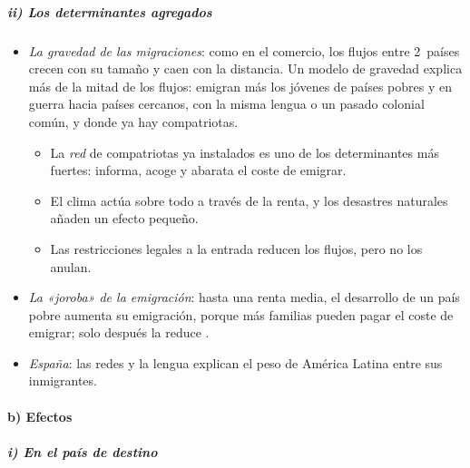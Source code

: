 \documentclass[11pt]{article}
\begin{document}
\subparagraph{ii) Los determinantes agregados}

\begin{itemize}
\item \emph{La gravedad de las migraciones}: como en el comercio, los flujos entre 2~países crecen con su tamaño y caen con la distancia. Un modelo de gravedad explica más de la mitad de los flujos: emigran más los jóvenes de países pobres y en guerra hacia países cercanos, con la misma lengua o un pasado colonial común, y donde ya hay compatriotas\nocite{FMI2020WEOMigracion}.
  \begin{itemize}
  \item La \emph{red} de compatriotas ya instalados es uno de los determinantes más fuertes: informa, acoge y abarata el coste de emigrar.
  \item El clima actúa sobre todo a través de la renta, y los desastres naturales añaden un efecto pequeño.
  \item Las restricciones legales a la entrada reducen los flujos, pero no los anulan.
  \end{itemize}
\item \emph{La «joroba» de la emigración}: hasta una renta media, el desarrollo de un país pobre aumenta su emigración, porque más familias pueden pagar el coste de emigrar; solo después la reduce\nocite{Clemens2014Development} .
\item \emph{España}: las redes y la lengua explican el peso de América Latina entre sus inmigrantes\nocite{INE2026ECP2T}.
\end{itemize}

\paragraph{b) Efectos}

\subparagraph{i) En el país de destino}
\end{document}
